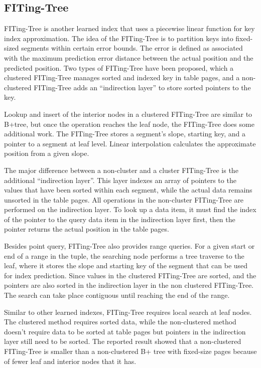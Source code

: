 \subsection{FITing-Tree}
FITing-Tree \cite{galakatos2019fiting} is another learned index that uses a piecewise linear function for key index approximation. The idea of the FITing-Tree is to partition keys into fixed-sized segments within certain error bounds. The error is defined as associated with the maximum prediction error distance between the actual position and the predicted position. Two types of FITing-Tree have been proposed, which a clustered FITing-Tree manages sorted and indexed key in table pages, and a non-clustered FITing-Tree adds an “indirection layer” to store sorted pointers to the key. 

Lookup and insert of the interior nodes in a clustered FITing-Tree are similar to B+tree, but once the operation reaches the leaf node, the FITing-Tree does some additional work. The FITing-Tree stores a segment's slope, starting key, and a pointer to a segment at leaf level. Linear interpolation calculates the approximate position from a given slope. 

The major difference between a non-cluster and a cluster FITing-Tree is the additional “indirection layer”. This layer indexes an array of pointers to the values that have been sorted within each segment, while the actual data remains unsorted in the table pages. All operations in the non-cluster FITing-Tree are performed on the indirection layer. To look up a data item, it must find the index of the pointer to the query data item in the indirection layer first, then the pointer returns the actual position in the table pages.

Besides point query, FITing-Tree also provides range queries. For a given start or end of a range in the tuple, the searching node performs a tree traverse to the leaf, where it stores the slope and starting key of the segment that can be used for index prediction. Since values in the clustered FITing-Tree are sorted, and the pointers are also sorted in the indirection layer in the non clustered FITing-Tree. The search can take place contiguous until reaching the end of the range. 


Similar to other learned indexes, FITing-Tree requires local search at leaf nodes. The clustered method requires sorted data, while the non-clustered method doesn’t require data to be sorted at table pages but pointers in the indirection layer still need to be sorted. The reported result \cite{galakatos2019fiting} showed that a non-clustered FITing-Tree is smaller than a non-clustered B+ tree with fixed-size pages because of fewer leaf and interior nodes that it has. 



